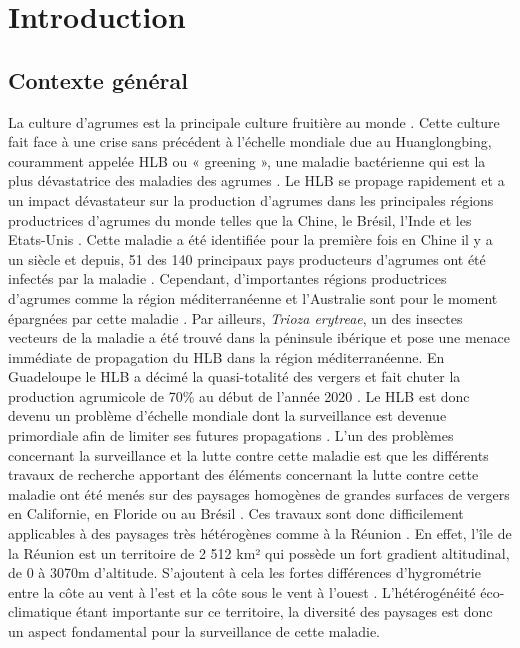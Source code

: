 \documentclass[
  11pt,
  french,
  a4paper,
  extrafontsizes,onecolumn,openright
  ]{memoir}
\begin{document}
\scriptsize

\normalsize

\mainmatter

\hypertarget{introduction}{%
\chapter{Introduction}\label{introduction}}

\vspace*{4cm}

\hypertarget{contexte-guxe9nuxe9ral}{%
\section{Contexte général}\label{contexte-guxe9nuxe9ral}}

La culture d'agrumes est la principale culture fruitière au monde \autocite{comte_apport_2013}. Cette culture fait face à une crise sans précédent à l'échelle mondiale due au Huanglongbing, couramment appelée HLB ou « greening », une maladie bactérienne qui est la plus dévastatrice des maladies des agrumes \autocite{moriya_detecting_2019}. Le HLB se propage rapidement et a un impact dévastateur sur la production d'agrumes dans les principales régions productrices d'agrumes du monde telles que la Chine, le Brésil, l'Inde et les Etats-Unis \autocite{deng_detection_2020}. Cette maladie a été identifiée pour la première fois en Chine il y a un siècle et depuis, 51 des 140 principaux pays producteurs d'agrumes ont été infectés par la maladie \autocite{moriya_detecting_2019}. Cependant, d'importantes régions productrices d'agrumes comme la région méditerranéenne et l'Australie sont pour le moment épargnées par cette maladie \autocite{gutierrez_prospective_2013}. Par ailleurs, \emph{Trioza erytreae}, un des insectes vecteurs de la maladie a été trouvé dans la péninsule ibérique et pose une menace immédiate de propagation du HLB dans la région méditerranéenne. En Guadeloupe le HLB a décimé la quasi-totalité des vergers et fait chuter la production agrumicole de 70\% au début de l'année 2020 \autocite{morillon_huanglongbing_2020}. Le HLB est donc devenu un problème d'échelle mondiale dont la surveillance est devenue primordiale afin de limiter ses futures propagations \autocite{wang_citrus_2019}.
\vfill
\newpage
L'un des problèmes concernant la surveillance et la lutte contre cette maladie est que les différents travaux de recherche apportant des éléments concernant la lutte contre cette maladie ont été menés sur des paysages homogènes de grandes surfaces de vergers en Californie, en Floride ou au Brésil \autocite{narouei-khandan_global_2016}.
Ces travaux sont donc difficilement applicables à des paysages très hétérogènes comme à la Réunion \autocite{gottwald_current_2010}.
En effet, l'île de la Réunion est un territoire de 2 512 km² qui possède un fort gradient altitudinal, de 0 à 3070m d'altitude. S'ajoutent à cela les fortes différences d'hygrométrie entre la côte au vent à l'est et la côte sous le vent à l'ouest \autocite{guilloteau_utilisation_2018}. L'hétérogénéité éco-climatique étant importante sur ce territoire, la diversité des paysages est donc un aspect fondamental pour la surveillance de cette maladie.
\end{document}
